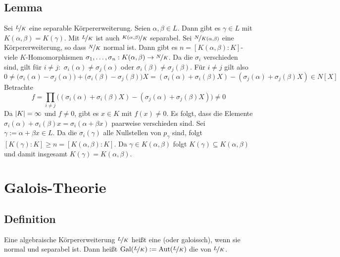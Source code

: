 \subsection[Lemma: Induktionsschritt für den Satz vom primitiven Element]{Lemma} %
\label{sub:1616}
Sei $\nicefrac{L}{K}$ eine separable Körpererweiterung. Seien $\alpha, \beta \in L$. Dann gibt es $\gamma \in L$ mit $K(\alpha, \beta) = K(\gamma)$.
Mit $\nicefrac{L}{K}$ ist auch $\nicefrac{K(\alpha, \beta)}{K}$ separabel. Sei $\nicefrac{N}{K(\alpha, \beta)}$ eine Körpererweiterung, so dass $\nicefrac{N}{K}$ normal
ist. Dann gibt es $n=[K(\alpha,\beta):K]$-viele $K$-Homomorphismen $\sigma_1, \ldots , \sigma_n : K(\alpha,\beta) \to \nicefrac{N}{K}$. Da die $\sigma_i$ verschieden sind,
gilt für $i \not= j: $ $\sigma_i(\alpha) \not= \sigma_j(\alpha)$ oder $\sigma_i(\beta) \not= \sigma_j(\beta)$. Für $i \not= j$ gilt also
\[
	0 \not= \big( \sigma_i(\alpha)- \sigma_j(\alpha)\big) + \big(\sigma_i(\beta)- \sigma_j(\beta)\big) X = (\sigma_i(\alpha) + \sigma_i(\beta) X) - (\sigma_j(\alpha)+ \sigma_j(\beta)X)
	\in N[X]
\]
Betrachte 
\[
	f= \prod_{i\not= j} \big((\sigma_i(\alpha)+ \sigma_i(\beta)X) - (\sigma_j(\alpha)+ \sigma_j(\beta)X)\big) \not= 0 
\]
Da $\lvert K\rvert=\infty $ und $f\not= 0$, gibt es $x \in K$ mit $f(x) \not= 0$. Es folgt, dass die Elemente $\sigma_i(\alpha)+ \sigma_i(\beta)x = \sigma_i(\alpha+ \beta x)$
paarweise verschieden sind. Sei $\gamma := \alpha+ \beta x \in L$. Da die $\sigma_i(\gamma)$ alle Nullstellen von $p_\gamma$ sind, folgt 
$[K(\gamma):K] \ge n = [K(\alpha, \beta):K]$. Da $\gamma \in K(\alpha, \beta)$ folgt $K(\gamma) \subseteq K(\alpha,\beta)$ und damit insgesamt 
$K(\gamma)= K(\alpha, \beta)$. \bewende
\newpage

\section{Galois-Theorie} %
\label{sec:17}

\subsection[Definition: Galois-Erweiterung und Galois-Gruppe]{Definition} %
\label{sub:171}
Eine algebraische Körpererweiterung $\nicefrac{L}{K}$ heißt eine  (oder galoissch), wenn sie normal und separabel ist. Dann heißt 
$\operatorname{Gal} (\nicefrac{L}{K}) := \operatorname{Aut} (\nicefrac{L}{K})  $ die  von $\nicefrac{L}{K}$. 

